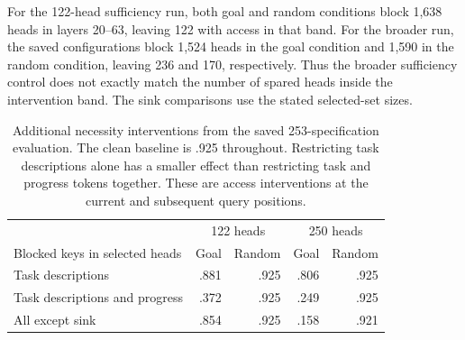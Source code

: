 For the 122-head sufficiency run, both goal and random conditions block 1,638 heads in layers 20--63, leaving 122 with access in that band. For the broader run, the saved configurations block 1,524 heads in the goal condition and 1,590 in the random condition, leaving 236 and 170, respectively. Thus the broader sufficiency control does not exactly match the number of spared heads inside the intervention band. The sink comparisons use the stated selected-set sizes.

\begin{table}[ht]\centering\small
\begin{tabular}{lrrrr}\toprule
 & \multicolumn{2}{c}{122 heads} & \multicolumn{2}{c}{250 heads}\\
Blocked keys in selected heads & Goal & Random & Goal & Random\\\midrule
Task descriptions & .881 & .925 & .806 & .925\\
Task descriptions and progress & .372 & .925 & .249 & .925\\
All except sink & .854 & .925 & .158 & .921\\\bottomrule
\end{tabular}
\caption{Additional necessity interventions from the saved 253-specification evaluation. The clean baseline is .925 throughout. Restricting task descriptions alone has a smaller effect than restricting task and progress tokens together. These are access interventions at the current and subsequent query positions.}
\label{tab:ablation-spans}
\end{table}



